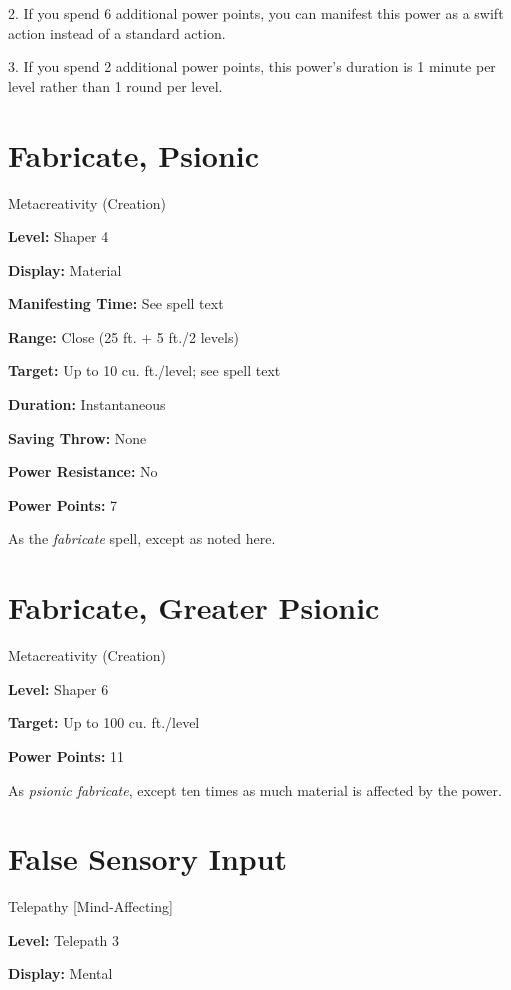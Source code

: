 \documentclass{article}
\begin{document}
2. If you spend 6 additional power points, you can manifest this power as a swift 
action instead of a standard action.

3. If you spend 2 additional power points, this power's duration is 1 minute per 
level rather than 1 round per level.

\vspace{12pt}
\section*{Fabricate, Psionic}

Metacreativity (Creation)

\textbf{Level:} Shaper 4

\textbf{Display:} Material

\textbf{Manifesting Time:} See spell text

\textbf{Range:} Close (25 ft. + 5 ft./2 levels)

\textbf{Target:} Up to 10 cu. ft./level; see spell text

\textbf{Duration:} Instantaneous

\textbf{Saving Throw:} None

\textbf{Power Resistance:} No

\textbf{Power Points:} 7

As the \textit{fabricate }spell, except as noted here.

\vspace{12pt}
\section*{Fabricate, Greater Psionic}

Metacreativity (Creation)

\textbf{Level:} Shaper 6

\textbf{Target:} Up to 100 cu. ft./level

\textbf{Power Points:} 11

As \textit{psionic fabricate}, except ten times as much material is affected by 
the power.

\vspace{12pt}
\section*{False Sensory Input}

Telepathy [Mind-Affecting]

\textbf{Level:} Telepath 3

\textbf{Display:} Mental
\end{document}
